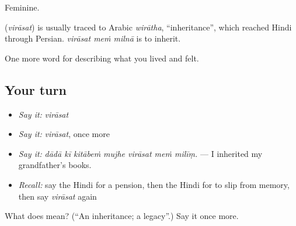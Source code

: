 Feminine.

\begin{cousinweb}
\textbf{} (\emph{virāsat}) is usually traced to Arabic \emph{wirātha}, \textquotedblleft{}inheritance\textquotedblright{}, which reached Hindi through Persian. \emph{virāsat meṁ milnā} is to inherit.
\end{cousinweb}

\begin{grammarlens}[title={What you've built}]
One more word for describing what you lived and felt.
\end{grammarlens}

\subsection*{Your turn}
\begin{itemize}
\raggedright
  \item \emph{Say it:} \emph{virāsat}
  \item \emph{Say it:} \emph{virāsat}, once more
  \item \emph{Say it:} \emph{dādā kī kitābeṁ mujhe virāsat meṁ milīṃ.} — I inherited my grandfather's books.
  \item \emph{Recall:} say the Hindi for a pension, then the Hindi for to slip from memory, then say \emph{virāsat} again
\end{itemize}

\begin{tcolorbox}[breakable,colback=teal!4,colframe=teal!35!black,title={Before you move on}]
What does  mean? (\textquotedblleft{}An inheritance; a legacy\textquotedblright{}.) Say it once more.
\end{tcolorbox}
